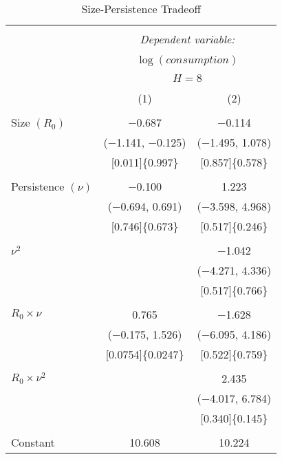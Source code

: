 \documentclass[12pt]{article}
\numberwithin{equation}{section}
\begin{document}
\begin{table}[!htb] \centering \footnotesize
    \begin{threeparttable}
    \caption{Size-Persistence Tradeoff} 
    \label{tab:Size-Persistence} 
    \begin{tabular}{@{\extracolsep{10pt}}lcc} 
      \\[-1.8ex]\hline 
      \hline \\[-1.8ex] 
       & \multicolumn{2}{c}{\textit{Dependent variable:}} \\ 
      \cline{2-3} 
      \\[-1.8ex] & \multicolumn{2}{c}{$\log(\mathit{consumption})$} \\  \\[-1.8ex]   &\multicolumn{2}{c}{$H=8$}\\
      \\[-1.8ex] & (1) & (2)\\ 
      \hline \\[-1.8ex] 
       Size $(R_0)$  & $-$0.687 & $-$0.114 \\ 
        & ($-$1.141, $-$0.125) & ($-$1.495, 1.078)    \\ 
        &[0.011]\{0.997\} & [0.857]\{0.578\}\\ 
        & & \\ 
       Persistence $(\nu)$ & $-$0.100 & 1.223 \\ 
        & ($-$0.694,  0.691)   & ($-$3.598, 4.968)    \\ 
        &[0.746]\{0.673\} & [0.517]\{0.246\}\\ 
        & & \\ 
        $\nu^2$ &  & $-$1.042 \\ 
        &  &  ($-$4.271, 4.336) \\ 
        & &[0.517]\{0.766\} \\ 
        & & \\ 
       $R_0\times \nu$ & 0.765 & $-$1.628 \\ 
        & ($-$0.175,  1.526)    &   ($-$6.095,  4.186)     \\ 
        &[0.0754]\{0.0247\} & [0.522]\{0.759\}\\ 
        & & \\ 
        $R_0\times \nu^2$ &  & 2.435 \\ 
        &  &  ($-$4.017, 6.784) \\ 
        & & [0.340]\{0.145\}\\ 
        & & \\ 
       Constant & 10.608 & 10.224 \\ 

\end{tabular}
\end{threeparttable}
\end{table}
\end{document}
